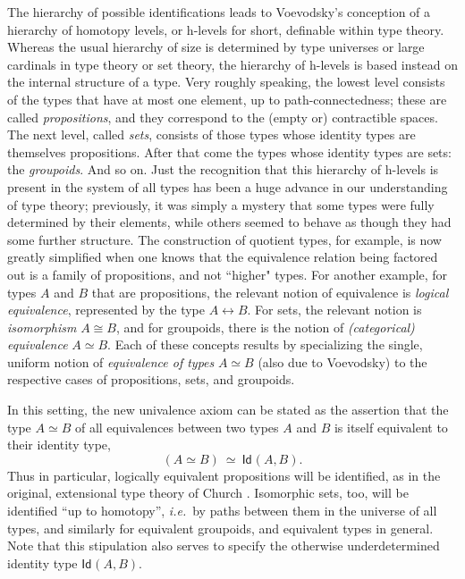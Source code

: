 \documentclass[11pt]{article}
\newcommand{\Id}{\mathsf{Id}}
\newcommand{\id}[1]{\Id_{#1}}
\theoremstyle{remark}
\theoremstyle{definition}
\begin{document}
The hierarchy of possible identifications leads to Voevodsky's conception of a hierarchy of homotopy levels, or h-levels for short, definable within type theory.  Whereas the usual hierarchy of size is determined by type universes or large
cardinals in type theory or set theory, the hierarchy of h-levels is based instead on the internal
structure of a type. 
Very roughly speaking, the lowest level consists of the types that have at most one element, up to path-connectedness; these are called \emph{propositions}, and they correspond to the (empty or) contractible spaces.  The next level, called \emph{sets}, consists of those types
whose identity types are themselves propositions. After that come the types whose identity types are sets: the \emph{groupoids}.
And so on.  Just the recognition that this hierarchy of h-levels is present in the system of all types has been a huge
advance in our understanding of type theory; previously, it was simply a mystery that some types were fully determined
by their elements, while others seemed to behave as though they had some further structure.  The construction of
quotient types, for example, is now greatly simplified when one knows that the equivalence relation being factored out
is a family of propositions, and not ``higher" types.  For another example, for types $A$ and $B$ that are propositions,
the relevant notion of equivalence is \emph{logical equivalence}, represented by the type $A\leftrightarrow B$.  For
sets, the relevant notion is \emph{isomorphism} $A\cong B$, and for groupoids, there is the notion of
\emph{(categorical) equivalence} $A\simeq B$.  Each of these concepts results by specializing the single, uniform notion
of \emph{equivalence of types} $A\simeq B$ (also due to Voevodsky) to the respective cases of propositions, sets, and groupoids.  

In this setting, the new univalence axiom can be stated as the assertion that the type $A\simeq B$ of all equivalences between
two types $A$ and $B$ is itself equivalent to their identity type,
\[\tag{UA}
(A\simeq B)\ \simeq\  \id{}(A,B).
\]
Thus in particular, logically equivalent propositions will be identified, as in the original, extensional type theory of
Church \cite{Church}.  Isomorphic sets, too, will be identified ``up to homotopy'', \textit{i.e.}\ by paths between them in the
universe of all types, and similarly for equivalent groupoids, and equivalent types in general.  Note that this stipulation also serves to specify the otherwise underdetermined identity type $ \id{}(A,B)$.
\end{document}
